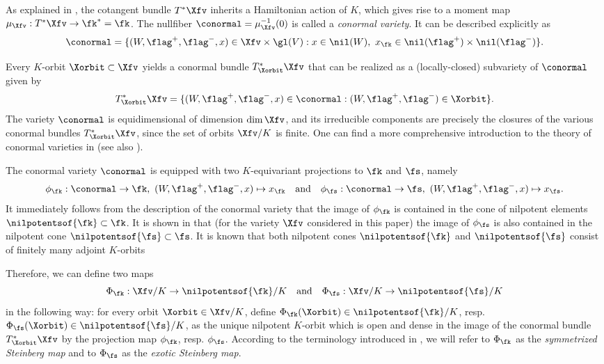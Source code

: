 As explained in \cite[\S3]{FN2}, the cotangent bundle $T^*\Xfv$ inherits a Hamiltonian action of $K$, which gives rise to a moment map $\mu_\Xfv:T^*\Xfv\to\fk^*=\fk$.
The nullfiber $\conormal=\mu_\Xfv^{-1}(0)$ is called a {\em conormal variety}. It can be described explicitly as
\[
\conormal=\{(W,\flag^+,\flag^-,x)\in \Xfv\times\gl(V):x\in\nil(W),\ x_\fk\in\nil(\flag^+)\times\nil(\flag^-)\}.
\]

Every $K$-orbit $\Xorbit\subset \Xfv$ yields a conormal bundle $T^*_\Xorbit\Xfv$ that can be realized as a (locally-closed) subvariety of $\conormal$ given by
\[
T^*_\Xorbit\Xfv=\{(W,\flag^+,\flag^-,x)\in\conormal:(W,\flag^+,\flag^-)\in\Xorbit\}.
\]
The variety $\conormal$ is equidimensional of dimension $\dim\Xfv$, and its irreducible components are precisely the closures of the various conormal bundles $T^*_\Xorbit\Xfv$, since the set of orbits $\Xfv/K$ is finite.
One can find a more comprehensive introduction to the theory of conormal varieties in \cite[\S 3]{FN2} (see also \cite{CG}).

The conormal variety $\conormal$ is equipped with two $K$-equivariant projections to $\fk$ and $\fs$, namely
\[\phi_\fk:\conormal\to\fk,\ (W,\flag^+,\flag^-,x)\mapsto x_\fk\quad\mbox{and}\quad
\phi_\fs:\conormal\to\fs,\ (W,\flag^+,\flag^-,x)\mapsto x_\fs.\]
It immediately follows from the description of the conormal variety that the image of $\phi_\fk$ is contained in the cone of nilpotent elements $\nilpotentsof{\fk}\subset\fk$.
It is shown in \cite[Proposition 4.2]{FN1} that (for the variety $\Xfv$ considered in this paper) the image of $\phi_\fs$ is also contained in the nilpotent cone $\nilpotentsof{\fs}\subset\fs$.
It is known that both nilpotent cones $\nilpotentsof{\fk}$ and $\nilpotentsof{\fs}$ consist of finitely many adjoint $K$-orbits

Therefore, we can define two maps
\[\Phi_\fk:\Xfv/K\to\nilpotentsof{\fk}/K
\quad\mbox{and}\quad
\Phi_\fs:\Xfv/K\to\nilpotentsof{\fs}/K\]
in the following way: for every orbit $\Xorbit\in\Xfv/K$, define $\Phi_\fk(\Xorbit)\in \nilpotentsof{\fk}/K$, resp. $\Phi_\fs(\Xorbit)\in\nilpotentsof{\fs}/K$, as the unique nilpotent $K$-orbit which is open and dense in the image of the conormal bundle $T^*_\Xorbit\Xfv$ by the projection map $\phi_\fk$, resp. $\phi_\fs$. According to the terminology introduced in \cite{FN2}, we will refer to $\Phi_\fk$ as the {\em symmetrized Steinberg map} and to $\Phi_\fs$ as the {\em exotic Steinberg map}.

